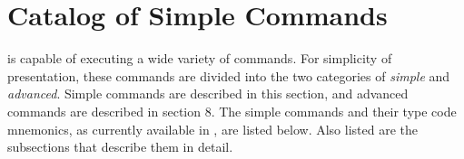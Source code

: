 
\chapter{Catalog of Simple Commands}
 is capable of executing a wide variety of commands.  For
simplicity of presentation, these commands are divided into the two
categories of {\em simple } and {\em advanced}.  Simple commands are described in this
section, and advanced commands are described in section 8.  The simple
commands and their type code mnemonics, as currently available in , are listed below.   Also listed are the subsections that describe them
in detail.

